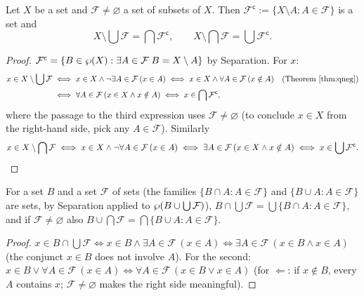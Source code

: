 \begin{theorem}\label{thm:gendemorgan}
	Let $X$ be a set and $\mathcal F\ne\varnothing$ a set of subsets of $X$. Then $\mathcal F^{\mathsf c}:=\{X\setminus A:A\in\mathcal F\}$ is a set and
	\[
	X\setminus\bigcup\mathcal F=\bigcap\mathcal F^{\mathsf c},\qquad X\setminus\bigcap\mathcal F=\bigcup\mathcal F^{\mathsf c}.
	\]
\end{theorem}
\begin{proof}
	$\mathcal F^{\mathsf c}=\{B\in\wp(X):\exists A\in\mathcal F\;B=X\setminus A\}$ by Separation. For $x$:
	\begin{align*}
		x\in X\setminus\bigcup\mathcal F&\iff x\in X\wedge\neg\exists A\in\mathcal F\,(x\in A)\iff x\in X\wedge\forall A\in\mathcal F\,(x\notin A)\quad(\text{Theorem~\ref{thm:qneg}})\\
		&\iff\forall A\in\mathcal F\,(x\in X\wedge x\notin A)\iff x\in\bigcap\mathcal F^{\mathsf c},
	\end{align*}
	where the passage to the third expression uses $\mathcal F\ne\varnothing$ (to conclude $x\in X$ from the right-hand side, pick any $A\in\mathcal F$). Similarly
	\[
	x\in X\setminus\bigcap\mathcal F\iff x\in X\wedge\neg\forall A\in\mathcal F\,(x\in A)\iff\exists A\in\mathcal F\,(x\in X\wedge x\notin A)\iff x\in\bigcup\mathcal F^{\mathsf c}.\qedhere
	\]
\end{proof}

\begin{proposition}
	For a set $B$ and a set $\mathcal F$ of sets (the families $\{B\cap A:A\in\mathcal F\}$ and $\{B\cup A:A\in\mathcal F\}$ are sets, by Separation applied to $\wp(B\cup\bigcup\mathcal F)$), $B\cap\bigcup\mathcal F=\bigcup\{B\cap A:A\in\mathcal F\}$, and if $\mathcal F\neq\varnothing$ also $B\cup\bigcap\mathcal F=\bigcap\{B\cup A:A\in\mathcal F\}$.
\end{proposition}
\begin{proof}
	$x\in B\cap\bigcup\mathcal F\iff x\in B\wedge\exists A\in\mathcal F\,(x\in A)\iff\exists A\in\mathcal F\,(x\in B\wedge x\in A)$ (the conjunct $x\in B$ does not involve $A$). For the second: $x\in B\vee\forall A\in\mathcal F\,(x\in A)\iff\forall A\in\mathcal F\,(x\in B\vee x\in A)$ (for $\Leftarrow$: if $x\notin B$, every $A$ contains $x$; $\mathcal F\ne\varnothing$ makes the right side meaningful).
\end{proof}